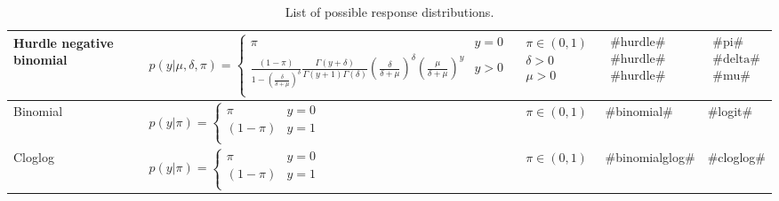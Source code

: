 \begin{sidewaystable}[htbp]
\begin{center}
\begin{tabular}{l l c l l}
Hurdle negative binomial &$p(y|\mu,\delta,\pi)=\begin{cases}
	\pi & y=0\\
		\frac{(1-\pi)}{1-\left(\frac{\delta}{\delta+\mu}\right)^{\delta}}\frac{\Gamma(y+\delta)}{\Gamma(y+1)\Gamma(\delta)}\left(\frac{\delta}{\delta+\mu}\right)^{\delta}\left(\frac{\mu}{\delta+\mu}\right)^{y} & y>0\\
			\end{cases}$&$\begin{matrix} \pi\in(0,1)\\\delta>0\\\mu>0
					 	\end{matrix}$ &$\begin{matrix} \text{#hurdle#}\\\text{#hurdle#}\\\text{#hurdle#}
					\end{matrix}$&$\begin{matrix} \text{#pi#}\\\text{#delta#}\\\text{#mu#}
					\end{matrix}$\\\hline
Binomial &$p(y|\pi)=\begin{cases}
	\pi & y=0\\
		(1-\pi) & y=1\\
			\end{cases}$&$\pi\in(0,1)$&#binomial#&#logit#\\\hline
Cloglog &$p(y|\pi)=\begin{cases}
	\pi & y=0\\
		(1-\pi) & y=1\\
			\end{cases}$&$\pi\in(0,1)$&#binomialglog#&#cloglog#\\
\hline\hline
\end{tabular}
\end{center}\caption{List of possible response distributions.}\label{tab:distrBayesX2}
\end{sidewaystable}

